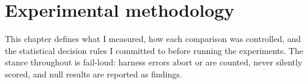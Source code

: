\chapter{Experimental methodology}\label{ch:methodology}

This chapter defines what I measured, how each comparison was controlled, and
the statistical decision rules I committed to before running the experiments.
The stance throughout is fail-loud: harness errors abort or are counted, never
silently scored, and null results are reported as findings.







